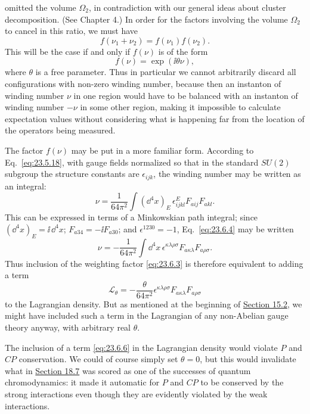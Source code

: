 omitted the volume $\Omega_2$, in contradiction with our general ideas
about cluster decomposition. (See Chapter 4.) In order for the factors
involving the volume $\Omega_2$ to cancel in this ratio, we must have
\[
f(\nu_1+\nu_2)=f(\nu_1)f(\nu_2).
\]
This will be the case if and only if $f(\nu)$ is of the form
\begin{equation}
f(\nu)=\exp(\ii\theta\nu),
\tag{23.6.3}\label{eq:23.6.3}
\end{equation}
where $\theta$ is a free parameter. Thus in particular we cannot
arbitrarily discard all configurations with non-zero winding number,
because then an instanton of winding number $\nu$ in one region would
have to be balanced with an instanton of winding number $-\nu$ in some
other region, making it impossible to calculate expectation values
without considering what is happening far from the location of the
operators being measured.

The factor $f(\nu)$ may be put in a more familiar form. According to
Eq.~\eqref{eq:23.5.18}, with gauge fields normalized so that in the
standard $SU(2)$ subgroup the structure constants are
$\epsilon_{ijk}$, the winding number may be written as an integral:
\begin{equation}
\nu=\frac{1}{64\pi^2}\int(\dd^4x)_E\,
\epsilon^E_{ijkl}F_{a ij}F_{a kl}.
\tag{23.6.4}\label{eq:23.6.4}
\end{equation}
This can be expressed in terms of a Minkowskian path integral; since
$(\dd^4x)_E=\ii\,\dd^4x$; $F_{a34}=-\ii F_{a30}$; and
$\epsilon^{1230}=-1$, Eq.~\eqref{eq:23.6.4} may be written
\begin{equation}
\nu=-\frac{1}{64\pi^2}\int \dd^4x\,
\epsilon^{\kappa\lambda\rho\sigma}
F_{a\kappa\lambda}F_{a\rho\sigma}.
\tag{23.6.5}\label{eq:23.6.5}
\end{equation}
Thus inclusion of the weighting factor \eqref{eq:23.6.3} is therefore
equivalent to adding a term
\begin{equation}
\mathcal L_\theta=-\frac{\theta}{64\pi^2}
\epsilon^{\kappa\lambda\rho\sigma}
F_{a\kappa\lambda}F_{a\rho\sigma}
\tag{23.6.6}\label{eq:23.6.6}
\end{equation}
to the Lagrangian density. But as mentioned at the beginning of
\hyperref[sec:15.2]{Section 15.2}, we might have included such a term in
the Lagrangian of any non-Abelian gauge theory anyway, with arbitrary
real $\theta$.

The inclusion of a term \eqref{eq:23.6.6} in the Lagrangian density would
violate $P$ and $CP$ conservation. We could of course simply set
$\theta=0$, but this would invalidate what in
\hyperref[sec:18.7]{Section 18.7} was scored as one of the successes of
quantum chromodynamics: it made it automatic for $P$ and $CP$ to be
conserved by the strong interactions even though they are evidently
violated by the weak interactions.

